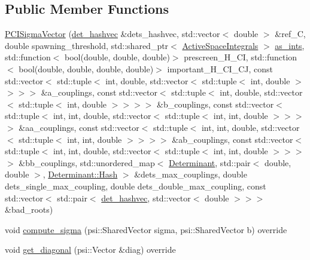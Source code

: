 \subsection*{Public Member Functions}
\begin{DoxyCompactItemize}
\item 
\mbox{\hyperlink{classforte_1_1_p_c_i_sigma_vector_aa5558c44abccf381e582889ec026e15b}{P\+C\+I\+Sigma\+Vector}} (\mbox{\hyperlink{namespaceforte_aee00ff2f656f0aa613d3f9f1ba01cad5}{det\+\_\+hashvec}} \&dets\+\_\+hashvec, std\+::vector$<$ double $>$ \&ref\+\_\+C, double spawning\+\_\+threshold, std\+::shared\+\_\+ptr$<$ \mbox{\hyperlink{classforte_1_1_active_space_integrals}{Active\+Space\+Integrals}} $>$ \mbox{\hyperlink{classforte_1_1_sigma_vector_aa732888f759ba00fa059ad1020425fe9}{as\+\_\+ints}}, std\+::function$<$ bool(double, double, double)$>$ prescreen\+\_\+\+H\+\_\+\+CI, std\+::function$<$ bool(double, double, double, double)$>$ important\+\_\+\+H\+\_\+\+C\+I\+\_\+\+CJ, const std\+::vector$<$ std\+::tuple$<$ int, double, std\+::vector$<$ std\+::tuple$<$ int, double $>$$>$$>$$>$ \&a\+\_\+couplings, const std\+::vector$<$ std\+::tuple$<$ int, double, std\+::vector$<$ std\+::tuple$<$ int, double $>$$>$$>$$>$ \&b\+\_\+couplings, const std\+::vector$<$ std\+::tuple$<$ int, int, double, std\+::vector$<$ std\+::tuple$<$ int, int, double $>$$>$$>$$>$ \&aa\+\_\+couplings, const std\+::vector$<$ std\+::tuple$<$ int, int, double, std\+::vector$<$ std\+::tuple$<$ int, int, double $>$$>$$>$$>$ \&ab\+\_\+couplings, const std\+::vector$<$ std\+::tuple$<$ int, int, double, std\+::vector$<$ std\+::tuple$<$ int, int, double $>$$>$$>$$>$ \&bb\+\_\+couplings, std\+::unordered\+\_\+map$<$ \mbox{\hyperlink{namespaceforte_a2076c63fd7b8732004d9e1442ce527c1}{Determinant}}, std\+::pair$<$ double, double $>$, \mbox{\hyperlink{structforte_1_1_bit_array_1_1_hash}{Determinant\+::\+Hash}} $>$ \&dets\+\_\+max\+\_\+couplings, double dets\+\_\+single\+\_\+max\+\_\+coupling, double dets\+\_\+double\+\_\+max\+\_\+coupling, const std\+::vector$<$ std\+::pair$<$ \mbox{\hyperlink{namespaceforte_aee00ff2f656f0aa613d3f9f1ba01cad5}{det\+\_\+hashvec}}, std\+::vector$<$ double $>$$>$$>$ \&bad\+\_\+roots)
\item 
void \mbox{\hyperlink{classforte_1_1_p_c_i_sigma_vector_ae09ecf8eb9f57ddb386c97603712383f}{compute\+\_\+sigma}} (psi\+::\+Shared\+Vector sigma, psi\+::\+Shared\+Vector b) override
\item 
void \mbox{\hyperlink{classforte_1_1_p_c_i_sigma_vector_ac6f0cf4d9b1756d07473382871f2a482}{get\+\_\+diagonal}} (psi\+::\+Vector \&diag) override
$$
\end{DoxyCompactItemize}
